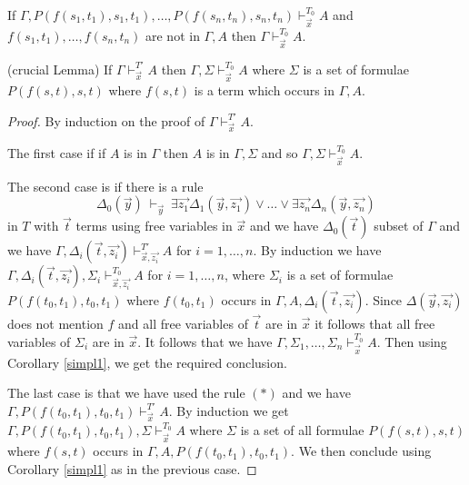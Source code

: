 \documentclass[10pt,a4paper]{article}
\begin{document}
\begin{corollary}\label{simpl1}
If $\Gamma,P(f(s_1,t_1),s_1,t_1),\dots,P(f(s_n,t_n),s_n,t_n)\vdash_{\vec{x}}^{T_0} A$ and
$f(s_1,t_1),\dots,f(s_n,t_n)$ are not in $\Gamma,A$ then $\Gamma\vdash_{\vec{x}}^{T_0} A$.
\end{corollary}


\begin{lemma} \label{crucial} (crucial Lemma) 
If $\Gamma\vdash_{\vec{x}}^{T'} A$ then $\Gamma,\Sigma\vdash_{\vec{x}}^{T_0} A$ where
$\Sigma$ is a set of formulae $P(f(s,t),s,t)$ where $f(s,t)$ is a term which
occurs in $\Gamma,A$.
\end{lemma}

\begin{proof}
By induction on the proof of $\Gamma\vdash_{\vec{x}}^{T'} A$.

\medskip

 The first case if if $A$ is in $\Gamma$ then $A$ is in $\Gamma,\Sigma$ and so 
$\Gamma,\Sigma\vdash_{\vec{x}}^{T_0} A$.

\medskip

 The second case is if there is a rule
$$
\Delta_0(\vec{y})~\vdash_{\vec{y}}~
\exists \vec{z_1}\Delta_1(\vec{y},\vec{z_1})\vee\dots\vee\exists \vec{z_n}\Delta_n(\vec{y},\vec{z_n})
$$
in $T$ with $\vec{t}$ terms using free variables in $\vec{x}$ and
we have $\Delta_0(\vec{t})$ subset of $\Gamma$ and we have
$\Gamma,\Delta_i(\vec{t},\vec{z_i})\vdash_{\vec{x},\vec{z_i}}^{T'} A$ for $i=1,\dots,n$.
By induction we have $\Gamma,\Delta_i(\vec{t},\vec{z_i}), \Sigma_i\vdash_{\vec{x},\vec{z_i}}^{T_0} A$
for $i = 1,\dots,n$, where $\Sigma_i$ is a set of formulae $P(f(t_0,t_1),t_0,t_1)$ where
$f(t_0,t_1)$ occurs in $\Gamma,A,\Delta_i(\vec{t},\vec{z_i})$.
Since $\Delta(\vec{y},\vec{z_i})$ does not mention $f$ and all free variables of $\vec{t}$ are
in $\vec{x}$ it follows that all free variables of $\Sigma_i$ are in $\vec{x}$.
It follows that we have
$\Gamma,\Sigma_1,\dots,\Sigma_n\vdash_{\vec{x}}^{T_0} A$.
Then using Corollary \ref{simpl1}, we get the required conclusion.

\medskip

 The last case is that we have used the rule $(*)$ and
we have $\Gamma,P(f(t_0,t_1),t_0,t_1)\vdash_{\vec{x}}^{T'} A$. By induction we get
$\Gamma,P(f(t_0,t_1),t_0,t_1),\Sigma \vdash_{\vec{x}}^{T_0} A$ where
$\Sigma$ is a set of all formulae $P(f(s,t),s,t)$ where $f(s,t)$ occurs
in $\Gamma,A,P(f(t_0,t_1),t_0,t_1)$. We then conclude using Corollary \ref{simpl1} as in the
previous case.
\end{proof}
\end{document}
